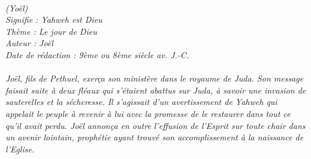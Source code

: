 \BFont
\noindent\hrulefill
{\footnotesize
\textit{
\bigskip
{\centering{}
\\(Yoël)
\\Signifie : Yahweh est Dieu
\\Thème : Le jour de Dieu
\\Auteur : Joël
\\Date de rédaction : 9ème ou 8ème siècle av. J.-C.\\}
}
\textit{
\\Joël, fils de Pethuel, exerça son ministère dans le royaume de Juda. Son message faisait suite à deux fléaux qui s’étaient abattus sur Juda, à savoir une invasion de sauterelles et la sécheresse. Il s’agissait d’un avertissement de Yahweh qui appelait le peuple à revenir à lui avec la promesse de le restaurer dans tout ce qu’il avait perdu. Joël annonça en outre l’effusion de l’Esprit sur toute chair dans un avenir lointain, prophétie ayant trouvé son accomplissement à la naissance de l’Eglise.\bigskip
}
}
\par\nobreak\noindent\hrulefill
